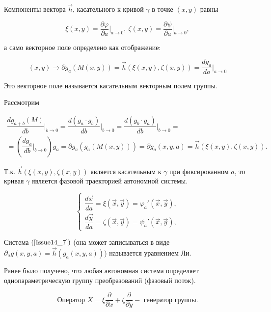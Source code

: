 Компоненты вектора $\vec{h}$, касательного к кривой $\gamma$ в точке $(x,y)$ равны

\[ \xi(x,y) = \dfrac{\partial \varphi}{\partial a}\bigg|_{a \rightarrow 0},\ \zeta(x,y) = \dfrac{\partial \psi }{\partial a}\bigg|_{a \rightarrow 0}, \]

а само векторное поле определено как отображение:

\begin{equation}
	(x,y) \rightarrow \partial g_a(M(x,y)) = \vec{h}(\xi(x,y), \zeta(x,y)) = \dfrac{dg_a}{da}\bigg|_{a \rightarrow 0}
	\label{Issue14_6}
\end{equation}

Это векторное поле называется $\textbf{касательным векторным полем}$ группы.

Рассмотрим 

\begin{equation}
	\begin{gathered}
		\dfrac{dg_{a+b}(M)}{db}\bigg|_{b\rightarrow 0} = \dfrac{d(g_a\cdot g_b)}{db}\bigg|_{b\rightarrow0} = \dfrac{d(g_b\cdot g_a)}{db}\bigg|_{b\rightarrow 0} = \\
		= \left(\dfrac{dg_a}{db}\bigg|_{b\rightarrow 0}\right)g_a = \partial g_a (g_a(M(x,y))) = \partial g_a (x,y,a) = \vec{h}(\xi(x,y), \zeta(x,y)).
	\end{gathered}
\end{equation}

Т.к. $\vec{h}(\xi(x,y), \zeta(x,y))$ является касательным к $\gamma$ при фиксированном $a$, то кривая $\gamma$ является $\textbf{фазовой траекторией}$ автономной системы.

\begin{equation}
	\begin{cases}
		\dfrac{d\vec{x}}{da} = \xi(\vec{x}, \vec{y}) = \varphi_a'(\vec{x}, \vec{y}), \\
		\dfrac{d\vec{y}}{da} = \zeta(\vec{x}, \vec{y}) = \psi_a'(\vec{x}, \vec{y}),		
	\end{cases}
	\label{Issue14_7}
\end{equation}

Система $(\ref{Issue14_7})$ (она может записываться в виде $\partial_a g(x,y,a) = \vec{h}(g_a(x,y,a))$) называется $\textbf{уравнением Ли}$.

Ранее было получено, что любая автономная система определяет однопараметрическую группу преобразований (фазовый поток).


\begin{equation}
	\text{Оператор } X = \xi \dfrac{\partial}{\partial x} + \zeta \dfrac{\partial}{\partial y} - \text{ генератор группы.}
	\label{Issue14_8}
\end{equation}

